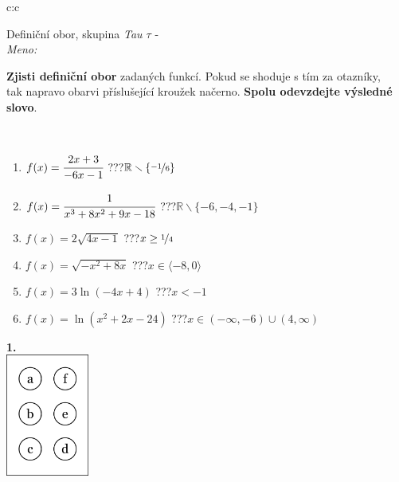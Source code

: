 \documentclass[10pt]{report}
\begin{document}
\begin{tabular}{c:c}
\begin{minipage}[c][104.5mm][t]{0.5\linewidth}
\begin{center}
\vspace{7mm}
{\huge Definiční obor, skupina \textit{Tau $\tau$} -}\\[5mm]
\textit{Meno:}\phantom{xxxxxxxxxxxxxxxxxxxxxxxxxxxxxxxxxxxxxxxxxxxxxxxxxxxxxxxxxxxxxxxxx}\\[5mm]
\begin{minipage}{0.95\linewidth}
\textbf{Zjisti definiční obor} zadaných funkcí. Pokud se shoduje s tím za otazníky,\\tak napravo obarvi příslušející kroužek načerno. \textbf{Spolu odevzdejte výsledné slovo}.
\end{minipage}
\\[1mm]
\begin{minipage}{0.79\linewidth}
\begin{center}
\begin{varwidth}{\linewidth}
\begin{enumerate}
\normalsizerrr
\item $f(x)=\cfrac{2x+3}{-6x-1}$\quad \dotfill\; ???\;\dotfill \quad $\mathbb{R}\smallsetminus\{\nicefrac{-1}{6}\}$
\item $f(x)=\cfrac{1}{x^3+8x^2+9x-18}$\quad \dotfill\; ???\;\dotfill \quad $\mathbb{R}\smallsetminus\{-6,-4,-1\}$
\item $f(x)=2\sqrt{4x-1}$\quad \dotfill\; ???\;\dotfill \quad $x\geq\nicefrac{1}{4}$
\item $f(x)=\sqrt{-x^2+8x}$\quad \dotfill\; ???\;\dotfill \quad $x\in\langle-8 , 0\rangle$
\item $f(x)=3\ln{(-4x+4)}$\quad \dotfill\; ???\;\dotfill \quad $x<-1$
\item $f(x)=\ln{(x^2+2x-24)}$\quad \dotfill\; ???\;\dotfill \quad $x\in(-\infty , -6)\cup(4 , \infty)$
\end{enumerate}
\end{varwidth}
\end{center}
\end{minipage}
\begin{minipage}{0.20\linewidth}
\begin{center}
{\Huge\bfseries 1.} \\[2mm]
\includegraphics[height=40mm]{../images/braille.png}

\end{center}
\end{minipage}
\end{center}
\end{minipage}
\end{tabular}
\end{document}
